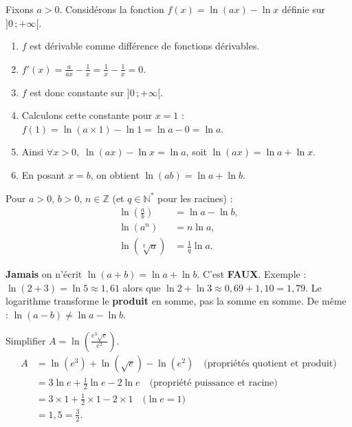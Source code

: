 \documentclass[11pt]{article}
\begin{document}
\begin{experience}[Démonstration guidée de $\ln(ab)=\ln a+\ln b$]
Fixons $a > 0$. Considérons la fonction $f(x) = \ln(ax) - \ln x$ définie sur $]0\,;+\infty[$.
\begin{enumerate}
    \item $f$ est dérivable comme différence de fonctions dérivables.
    \item $f'(x) = \frac{a}{ax} - \frac{1}{x} = \frac{1}{x} - \frac{1}{x} = 0$.
    \item $f$ est donc constante sur $]0\,;+\infty[$.
    \item Calculons cette constante pour $x=1$ : $f(1) = \ln(a \times 1) - \ln 1 = \ln a - 0 = \ln a$.
    \item Ainsi $\forall x > 0,\; \ln(ax) - \ln x = \ln a$, soit $\ln(ax) = \ln a + \ln x$.
    \item En posant $x = b$, on obtient $\ln(ab) = \ln a + \ln b$.
\end{enumerate}
\end{experience}

\begin{propriete}
Pour $a>0$, $b>0$, $n \in \mathbb{Z}$ (et $q \in \mathbb{N}^*$ pour les racines) :
\begin{align*}
    \ln\left(\frac{a}{b}\right) &= \ln a - \ln b, \\
    \ln(a^n) &= n \ln a, \\
    \ln(\sqrt[q]{a}) &= \frac{1}{q}\ln a.
\end{align*}
\end{propriete}

\begin{attention}
\textbf{Jamais} on n'écrit $\ln(a+b) = \ln a + \ln b$. C'est \textbf{FAUX}.
Exemple : $\ln(2+3) = \ln 5 \approx 1,61$ alors que $\ln 2 + \ln 3 \approx 0,69 + 1,10 = 1,79$.
Le logarithme transforme le \textbf{produit} en somme, pas la somme en somme.
De même : $\ln(a-b) \neq \ln a - \ln b$.
\end{attention}

\begin{exemplebox}
Simplifier $A = \ln\left(\frac{e^3 \sqrt{e}}{e^2}\right)$.
\begin{align*}
A &= \ln(e^3) + \ln(\sqrt{e}) - \ln(e^2) \quad\text{(propriétés quotient et produit)}\\
  &= 3\ln e + \frac{1}{2}\ln e - 2\ln e \quad\text{(propriété puissance et racine)}\\
  &= 3 \times 1 + \frac{1}{2} \times 1 - 2 \times 1 \quad\text{($\ln e = 1$)}\\
  &= 1,5 = \frac{3}{2}.
\end{align*}
\end{exemplebox}
\end{document}
